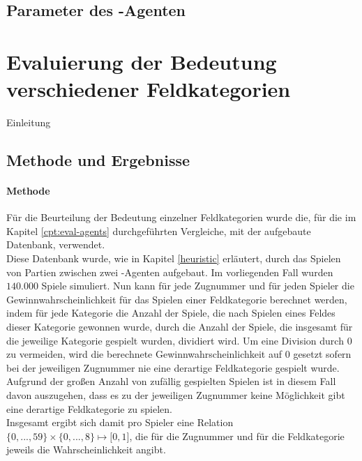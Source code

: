 \subsection*{Parameter des -Agenten}
\label{eval:agents:params:subsec-ab}


\section{Evaluierung der Bedeutung verschiedener Feldkategorien}
Einleitung
\subsection{Methode und Ergebnisse}
\paragraph{Methode}
Für die Beurteilung der Bedeutung einzelner Feldkategorien wurde die, für die im Kapitel \ref{cpt:eval-agents} durchgeführten Vergleiche, mit der  aufgebaute Datenbank, verwendet.
\\Diese Datenbank wurde, wie in Kapitel \ref{heuristic} erläutert, durch das Spielen von Partien zwischen zwei -Agenten aufgebaut. Im vorliegenden Fall wurden $140.000$ Spiele simuliert. Nun kann für jede Zugnummer und für jeden Spieler die Gewinnwahrscheinlichkeit für das Spielen einer Feldkategorie berechnet werden, indem für jede Kategorie die Anzahl der Spiele, die nach Spielen eines Feldes dieser Kategorie gewonnen wurde, durch die Anzahl der Spiele, die insgesamt für die jeweilige Kategorie gespielt wurden, dividiert wird. Um eine Division durch $0$ zu vermeiden, wird die berechnete Gewinnwahrscheinlichkeit auf $0$ gesetzt sofern bei der jeweiligen Zugnummer nie eine derartige Feldkategorie gespielt wurde. Aufgrund der großen Anzahl von zufällig gespielten Spielen ist in diesem Fall davon auszugehen, dass es zu der jeweiligen Zugnummer keine Möglichkeit gibt eine derartige Feldkategorie zu spielen. 
\\Insgesamt ergibt sich damit pro Spieler eine Relation $\lbrace0, ..., 59\rbrace\times\lbrace0, ..., 8\rbrace\mapsto\lbrack0,1\rbrack$, die für die Zugnummer und für die Feldkategorie jeweils die Wahrscheinlichkeit angibt.
  
